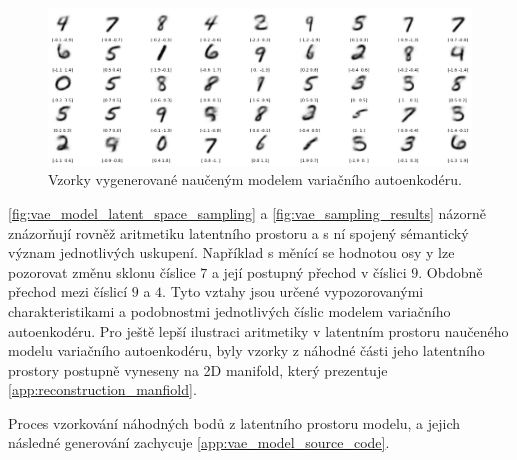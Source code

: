 \begin{figure}[H]
    \centering
    \includegraphics[width=\textwidth]{figures/vae_model_latent_space_sampling_results.png}
    \caption{Vzorky vygenerované naučeným modelem variačního autoenkodéru.}
    \label{fig:vae_sampling_results}
\end{figure}


\autoref{fig:vae_model_latent_space_sampling} a \autoref{fig:vae_sampling_results} názorně znázorňují rovněž aritmetiku latentního prostoru a s ní spojený sémantický význam jednotlivých uskupení.
Například s měnící se hodnotou osy y lze pozorovat změnu sklonu číslice $7$ a její postupný přechod v číslici $9$. Obdobně přechod mezi číslicí $9$ a $4$.
Tyto vztahy jsou určené vypozorovanými charakteristikami a podobnostmi jednotlivých číslic modelem variačního autoenkodéru.
Pro ještě lepší ilustraci aritmetiky v latentním prostoru naučeného modelu variačního autoenkodéru, byly vzorky z náhodné části jeho latentního prostory postupně vyneseny na 2D manifold, který prezentuje \autoref{app:reconstruction_manfiold}.

Proces vzorkování náhodných bodů z latentního prostoru modelu, a jejich následné generování zachycuje \autoref{app:vae_model_source_code}.